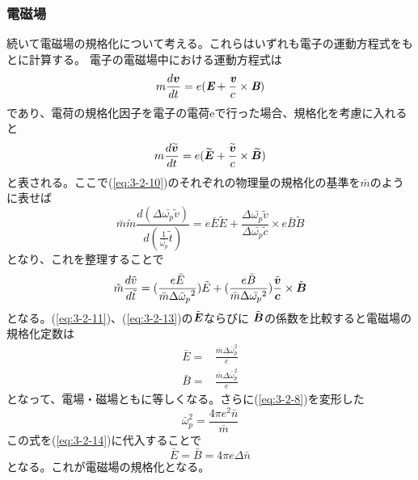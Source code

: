 \documentclass[a4paper,11pt,titlepage]{jarticle}
\newcommand{\bm}[1]{{\mbox{\boldmath $#1$}}}
\numberwithin{equation}{section} %
\begin{document}
  \subsubsection{電磁場}
  続いて電磁場の規格化について考える。これらはいずれも電子の運動方程式をもとに計算する。
  電子の電磁場中における運動方程式は
  \begin{equation}
    \label{eq:3-2-10}
    m \frac{d\bm{v}}{dt}=e(\textit{\textbf{E}}+
    \frac{\textit{\textbf{v}}}{c} \times \textit{\textbf{B}})
  \end{equation}
  であり、電荷の規格化因子を電子の電荷eで行った場合、規格化を考慮に入れると
  \begin{equation}
    \label{eq:3-2-11}
    m \frac{ d \widetilde{\bm{v}} }{ dt } 
    = e ( \widetilde{\bm{E}} + \frac{ \widetilde {\bm{v}} }{c} \times \bm{\widetilde {B}} )
  \end{equation}
  と表される。ここで(\ref{eq:3-2-10})のそれぞれの物理量の規格化の基準を$\bar m$のように表せば
  \begin{equation}
    \label{eq:3-2-12}
    {\bar m}{\tilde m}\frac{d(\Delta {\bar {\omega_p}} {\tilde v})}
    {d(\frac{1}{\bar {\omega_p}} \tilde t)}
    =e {\bar E} {\tilde E} + \frac{\Delta {\bar{\omega_p}}{\tilde v}}
    {\Delta {\bar{\omega_p}}{\tilde c}} \times e {\bar B}{\tilde B}
  \end{equation}
  となり、これを整理することで
  \begin{equation}
    \label{eq:3-2-13}
    \tilde{m} \frac{ d \tilde{v} }{ d \tilde{t} }
    = (\frac{e\bar E}{{\bar m} \Delta {\bar \omega_p}^2}){\tilde E} 
    + (\frac {e \bar{B} }{ \bar{m} \Delta \bar{\omega_p}^2}) 
    \frac{ \tilde{ \bm{v} } }{ \bm{c} } \times \tilde{ \bm{B} } 
  \end{equation}
  となる。(\ref{eq:3-2-11})、(\ref{eq:3-2-13})の$\tilde{\bm{E}}$ならびに
  $\tilde{\bm{B}}$の係数を比較すると電磁場の規格化定数は
  \begin{align}
    \label{eq:3-2-14}
    \bar E =&\frac{\bar m \Delta \bar \omega_p^2}{e}\\  
    \label{eq:3-2-15}
    \bar B =&\frac{\bar m \Delta \bar \omega_p^2}{e}  
  \end{align}
  となって、電場・磁場ともに等しくなる。さらに(\ref{eq:3-2-8})を変形した
  \begin{equation}
    \label{eq:3-2-16}
    \bar \omega_p^2 = \frac{4 \pi e^2 \bar n}{\bar m}
  \end{equation}
  この式を(\ref{eq:3-2-14})に代入することで
  \begin{equation}
    \label{eq:3-2-17}
    \bar E = \bar B = 4\pi e \Delta \bar n
  \end{equation}
  となる。これが電磁場の規格化となる。\\
\end{document}
